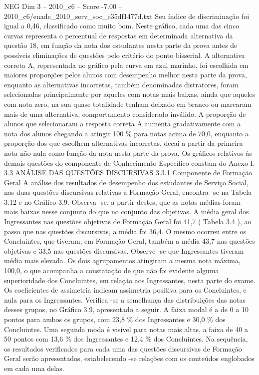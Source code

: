 \begin{textsample}{NEG Dim 3 – 2010\_c6 – Score -7.00 – 2010\_c6/enade\_2010\_serv\_soc\_e35df1477d.txt}
Seu índice de discriminação foi igual a 0,46, classificado como muito bom.
Neste gráfico, cada uma das cinco curvas representa o percentual de respostas em determinada alternativa da questão 18, em função da nota dos estudantes nesta parte da prova antes de possíveis eliminações de questões pelo critério do ponto bisserial.
A alternativa correta A, representada no gráfico pela curva em azul marinho, foi escolhida em maiores proporções pelos alunos com desempenho melhor nesta parte da prova, enquanto as alternativas incorretas, também denominadas distratores, foram selecionadas principalmente por aqueles com notas mais baixas, ainda que aqueles com nota zero, na sua quase totalidade tenham deixado em branco ou marcaram mais de uma alternativa, comportamento considerado inválido.
A proporção de alunos que selecionaram a resposta correta A aumenta gradativamente com a nota dos alunos chegando a atingir 100 \% para notas acima de 70,0, enquanto a proporção dos que escolhem alternativas incorretas, decai a partir da primeira nota não nula como função da nota nesta parte da prova.
Os gráficos relativos às demais questões do componente de Conhecimento Específico constam do Anexo I. 3.3 ANÁLISE DAS QUESTÕES DISCURSIVAS 3.3.1 Componente de Formação Geral A análise dos resultados de desempenho dos estudantes de Serviço Social, nas duas questões discursivas relativas à Formação Geral, encontra -se na Tabela 3.12 e no Gráfico 3.9.
Observa -se, a partir destes, que as notas médias foram mais baixas nesse conjunto do que no conjunto das objetivas.
A média geral dos Ingressantes nas questões objetivas de Formação Geral foi 41,7 ( Tabela 3.4 ), ao passo que nas questões discursivas, a média foi 36,4.
O mesmo ocorreu entre os Concluintes, que tiveram, em Formação Geral, também a média 43,7 nas questões objetivas e 33,5 nas questões discursivas.
Observe -se que Ingressantes tiveram média mais elevada.
Os dois agrupamentos atingiram a mesma nota máxima, 100,0, o que acompanha a constatação de que não foi evidente alguma superioridade dos Concluintes, em relação aos Ingressantes, nesta parte do exame.
Os coeficientes de assimetria indicam assimetria positiva para os Concluintes, e nula para os Ingressantes.
Verifica -se a semelhança das distribuições das notas desses grupos, no Gráfico 3.9, apresentado a seguir.
A faixa modal é a de 0 a 10 pontos para ambos os grupos, com 23,8 \% dos Ingressantes e 30,0 \% dos Concluintes.
Uma segunda moda é visível para notas mais altas, a faixa de 40 a 50 pontos com 13,6 \% dos Ingressantes e 12,4 \% dos Concluintes.
Na sequência, os resultados verificados para cada uma das questões discursivas de Formação Geral serão apresentados, estabelecendo -se relações com os conteúdos englobados em cada uma delas.

\end{textsample}
